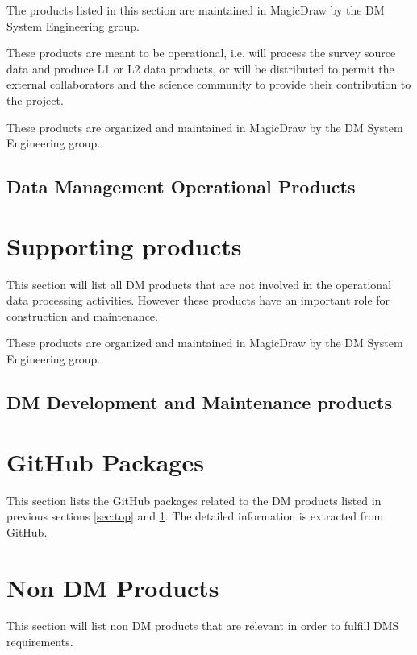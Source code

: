 The products listed in this section are maintained in MagicDraw by the DM System Engineering group. 

These products are meant to be operational, i.e. will process the survey source data and produce L1 or L2 data products, or will be distributed to permit the external collaborators and the science community to provide their contribution to the project.

These products are organized and maintained in MagicDraw by the DM System Engineering group.

\newpage
\subsection{Data Management Operational Products}\label{sec:dmtop}




\newpage
\section{Supporting products}\label{sec:sups}

This section will list all DM products that are not involved in the operational data processing activities. 
However these products have an important role for construction and maintenance.

These products are organized and maintained in MagicDraw by the DM System Engineering group.
\newpage
\subsection{DM Development and Maintenance products}



\newpage
\section{GitHub Packages}\label{sec:low}

This section lists the GitHub packages related to the DM products listed in previous sections \ref{sec:top} and \ref{sec:sups}.
The detailed information is extracted from GitHub.




\newpage
\section{Non DM Products}\label{sec:nondm}

This section will list non DM products that are relevant in order to fulfill DMS requirements.


